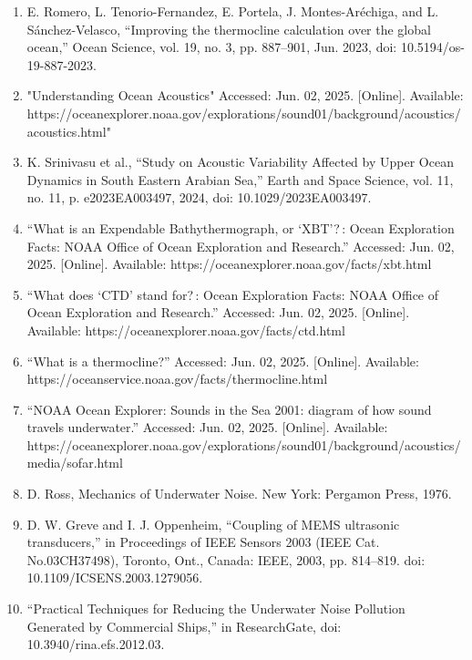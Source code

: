 \documentclass{article}
\begin{document}
\begin{enumerate}
    \item{E. Romero, L. Tenorio-Fernandez, E. Portela, J. Montes-Aréchiga, and L. Sánchez-Velasco, “Improving the thermocline calculation over the global ocean,” Ocean Science, vol. 19, no. 3, pp. 887–901, Jun. 2023, doi: 10.5194/os-19-887-2023.}

    \item {"Understanding Ocean Acoustics" Accessed: Jun. 02, 2025. [Online]. Available: https://oceanexplorer.noaa.gov/explorations/sound01/background/acoustics/acoustics.html"}

    \item{K. Srinivasu et al., “Study on Acoustic Variability Affected by Upper Ocean Dynamics in South Eastern Arabian Sea,” Earth and Space Science, vol. 11, no. 11, p. e2023EA003497, 2024, doi: 10.1029/2023EA003497.}

    \item{“What is an Expendable Bathythermograph, or ‘XBT’? : Ocean Exploration Facts: NOAA Office of Ocean Exploration and Research.” Accessed: Jun. 02, 2025. [Online]. Available: https://oceanexplorer.noaa.gov/facts/xbt.html}


    \item{“What does ‘CTD’ stand for? : Ocean Exploration Facts: NOAA Office of Ocean Exploration and Research.” Accessed: Jun. 02, 2025. [Online]. Available: https://oceanexplorer.noaa.gov/facts/ctd.html}


    \item{“What is a thermocline?” Accessed: Jun. 02, 2025. [Online]. Available: https://oceanservice.noaa.gov/facts/thermocline.html}


    \item{“NOAA Ocean Explorer: Sounds in the Sea 2001: diagram of how sound travels underwater.” Accessed: Jun. 02, 2025. [Online]. Available: https://oceanexplorer.noaa.gov/explorations/sound01/background/acoustics/media/sofar.html}


    \item{D. Ross, Mechanics of Underwater Noise. New York: Pergamon Press, 1976.}

    \item{D. W. Greve and I. J. Oppenheim, “Coupling of MEMS ultrasonic transducers,” in Proceedings of IEEE Sensors 2003 (IEEE Cat. No.03CH37498), Toronto, Ont., Canada: IEEE, 2003, pp. 814–819. doi: 10.1109/ICSENS.2003.1279056.}

    \item{“Practical Techniques for Reducing the Underwater Noise Pollution Generated by Commercial Ships,” in ResearchGate, doi: 10.3940/rina.efs.2012.03.}


\end{enumerate}
\end{document}
